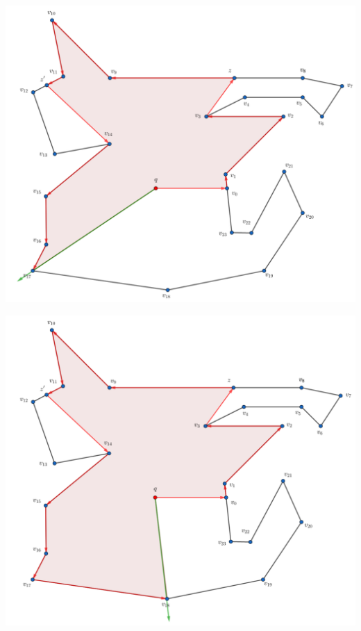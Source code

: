 \begin{frame}
  \centering \includegraphics[width=0.70 \paperwidth]{images/Ejecucion/e22.png}
\end{frame}

\begin{frame}
  \centering \includegraphics[width=0.70 \paperwidth]{images/Ejecucion/e23.png}
\end{frame}

